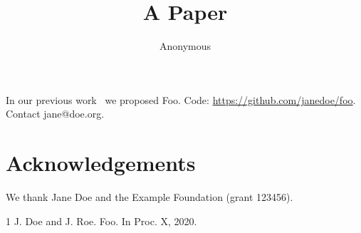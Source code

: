 \documentclass{article}
\title{A Paper}\author{Anonymous}
\begin{document}
\maketitle
\lipsum[1-9]
In our previous work~\cite{doe2020} we proposed Foo. Code: \url{https://github.com/janedoe/foo}. Contact jane@doe.org.
\section*{Acknowledgements}
We thank Jane Doe and the Example Foundation (grant 123456).
\begin{thebibliography}{1}
 J. Doe and J. Roe. Foo. In Proc. X, 2020.
\end{thebibliography}
\end{document}
